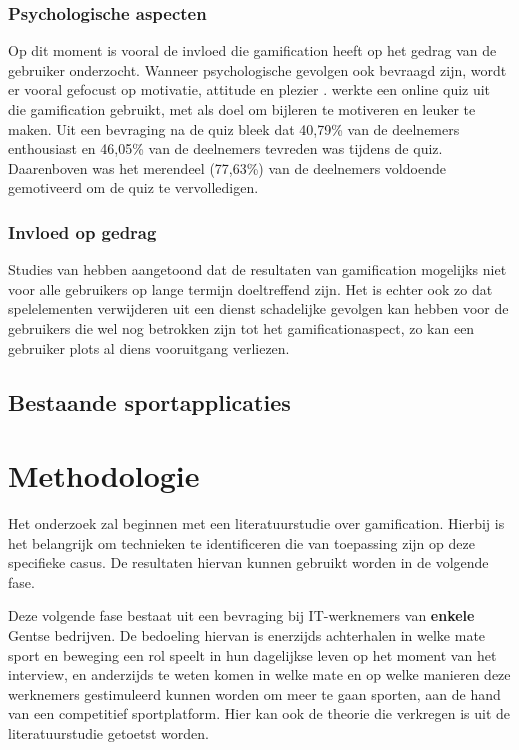 \subsubsection{Psychologische aspecten}
Op dit moment is vooral de invloed die gamification heeft op het gedrag van de gebruiker onderzocht.
Wanneer psychologische gevolgen ook bevraagd zijn, wordt er vooral gefocust op motivatie, attitude en plezier \autocite{Hamari2014}. \textcite{Cheong2013} werkte een online quiz uit die gamification gebruikt, met als doel om bijleren te motiveren en leuker te maken. Uit een bevraging  na de quiz bleek dat 40,79\% van de deelnemers enthousiast en 46,05\% van de deelnemers tevreden was tijdens de quiz. Daarenboven was het merendeel (77,63\%) van de deelnemers voldoende gemotiveerd om de quiz te vervolledigen.

\subsubsection{Invloed op gedrag}
Studies van \textcite{Hamari2013a} hebben aangetoond dat de resultaten van gamification mogelijks niet voor alle gebruikers op lange termijn doeltreffend zijn. Het is echter ook zo dat spelelementen verwijderen uit een dienst schadelijke gevolgen kan hebben voor de gebruikers die wel nog betrokken zijn tot het gamificationaspect, zo kan een gebruiker plots al diens vooruitgang verliezen.



\subsection{Bestaande sportapplicaties}




\section{Methodologie}%
\label{sec:methodologie}

Het onderzoek zal beginnen met een literatuurstudie over gamification. Hierbij is het belangrijk om technieken te identificeren die van toepassing zijn op deze specifieke casus. De resultaten hiervan kunnen gebruikt worden in de volgende fase.

Deze volgende fase bestaat uit een bevraging bij IT-werknemers van \textbf{enkele} Gentse bedrijven. De bedoeling hiervan is enerzijds achterhalen in welke mate sport en beweging een rol speelt in hun dagelijkse leven op het moment van het interview, en anderzijds te weten komen in welke mate en op welke manieren deze werknemers gestimuleerd kunnen worden om meer te gaan sporten, aan de hand van een competitief sportplatform. Hier kan ook de theorie die verkregen is uit de literatuurstudie getoetst worden.

